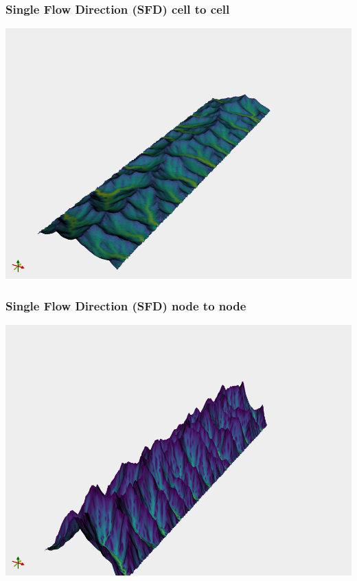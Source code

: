 \documentclass[aspectratio=169]{beamer}
\begin{document}
\begin{frame}
    \frametitle{Single Flow Direction (SFD) cell to cell}
    \centering
    \includegraphics[height=0.9\paperheight]{./figures/flem-sfd-c2c.png}
\end{frame}

\begin{frame}
    \frametitle{Single Flow Direction (SFD) node to node}
    \centering
    \includegraphics[height=0.9\paperheight]{./figures/flem-sfd-n2n.png}
\end{frame}
\end{document}
